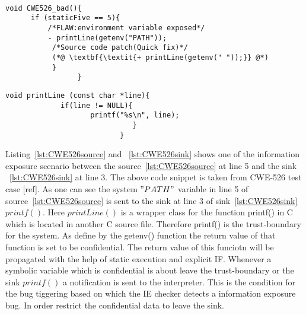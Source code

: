 \begin{lstlisting}[caption={CWE-526 test programs source},label={lst:CWE526source}]

void CWE526_bad(){
      if (staticFive == 5){
          /*FLAW:environment variable exposed*/
          - printLine(getenv("PATH"));
           /*Source code patch(Quick fix)*/
           (*@ \textbf{\textit{+ printLine(getenv(" "));}} @*) 
           }
                 }
\end{lstlisting}
 

\begin{lstlisting}[caption={CWE-526 test programs sink},label={lst:CWE526sink}]
void printLine (const char *line){
             if(line != NULL){
                    printf("%s\n", line);
                              }
                           }
\end{lstlisting}

Listing~\ref{lst:CWE526source} and ~\ref{lst:CWE526sink} shows one of the information
exposure scenario between the source~\ref{lst:CWE526source} at line 5 and the sink
~\ref{lst:CWE526sink} at line 3. The above code snippet is taken from CWE-526 test case
[ref]. As one can see the system $"PATH"$ variable in line 5 of source~\ref{lst:CWE526source}
is sent to the sink at line 3 of sink~\ref{lst:CWE526sink} $printf()$. Here $printLine()$
is a wrapper class for the function printf() in C which is located in another C source file.
Therefore printf() is the trust-boundary for the system. As define by the getenv() function
the return value of that function is set to be confidential. The return value of this funciotn
will be propagated with the help of static execution and explicit IF. Whenever 
a symbolic variable which is confidential is about leave the trust-boundary or the sink
$printf()$ a notification is sent to the interpreter. This is the condition
for the bug tiggering based on which the IE checker detects a information exposure bug.
In order restrict the confidential data to leave the sink.

